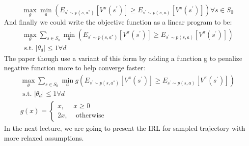 \documentclass[11pt]{article}
\begin{document}
$$
\max _{\theta} \min _{a}\left(E_{s^{\prime} \sim p\left(s, a^{*}\right)}\left[V^{\pi}\left(s^{\prime}\right)\right] \geq E_{s^{\prime} \sim p(s, a)}\left[V^{\pi}\left(s^{\prime}\right)\right]\right) \forall s \in S_{0}
$$
And finally we could write the objective function as a linear program to be:
$$
\begin{array}{l}
\max _{\theta} \sum_{s \in S_{0}} \min _{a}\left(E_{s^{\prime} \sim p\left(s, a^{*}\right)}\left[V^{\pi}\left(s^{\prime}\right)\right] \geq E_{s^{\prime} \sim p(s, a)}\left[V^{\pi}\left(s^{\prime}\right)\right]\right) \\
\text { s.t. }\left|\theta_{d}\right| \leq 1 \forall d
\end{array}
$$
The paper\cite{ng2000algorithms} though use a variant of this form by adding a function g to penalize negative function more to help converge faster:
$$
\begin{array}{l}
\max _{\theta} \sum_{s \in S_{0}} \min _{a} g\left(E_{s^{\prime} \sim p\left(s, a^{*}\right)}\left[V^{\pi}\left(s^{\prime}\right)\right] \geq E_{s^{\prime} \sim p(s, a)}\left[V^{\pi}\left(s^{\prime}\right)\right]\right) \\
\text { s.t. }\left|\theta_{d}\right| \leq 1 \forall d \\
g(x)=\left\{\begin{array}{ll}
x, & x \geq 0 \\
2 x, & \text { otherwise }
\end{array}\right.
\end{array}
$$
In the next lecture, we are going to present the IRL for sampled trajectory with more relaxed assumptions.

{


}
\end{document}
